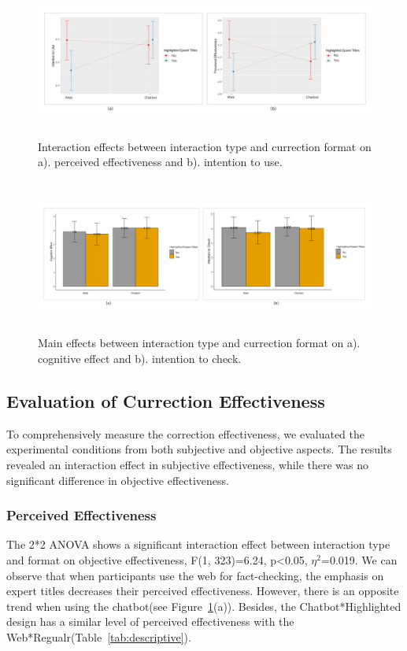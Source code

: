     \begin{figure}
        \centering
          \includegraphics[width=\textwidth,height=2in]{figs/Interaction.png}
        \caption{Interaction effects between interaction type and currection format on a). perceived effectiveness and b). intention to use.}
        \label{FIG:interaction}
    \end{figure}
    \begin{figure}
        \centering
          \includegraphics[width=\textwidth,height=2in]{figs/Maineffect.png}
        \caption{Main effects between interaction type and currection format on a). cognitive effect and b). intention to check.}
        \label{FIG:maineffect}
    \end{figure}
\subsection{Evaluation of Currection Effectiveness}
To comprehensively measure the correction effectiveness, we evaluated the experimental conditions from both subjective and objective aspects.
The results revealed an interaction effect in subjective effectiveness, while there was no significant difference in objective effectiveness.

\subsubsection{Perceived Effectiveness}
The 2*2 ANOVA shows a significant interaction effect between interaction type and format on objective effectiveness, F(1, 323)=6.24, p<0.05, $\eta^{2}$=0.019.
We can observe that when participants use the web for fact-checking, the emphasis on expert titles decreases their perceived effectiveness.
However, there is an opposite trend when using the chatbot(see Figure~\ref{FIG:interaction}(a)).
Besides, the Chatbot*Highlighted design has a similar level of perceived effectiveness with the Web*Regualr(Table~\ref{tab:descriptive}).

